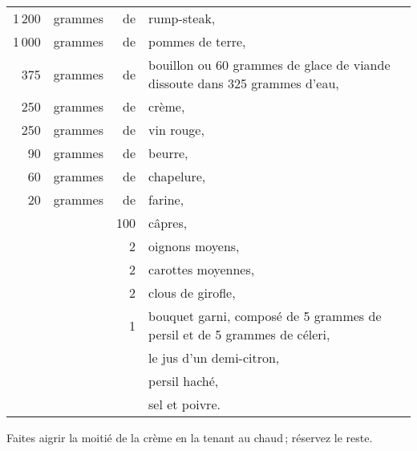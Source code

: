 \footnotesize
\begin{longtable}{rrrp{16em}}
  1 200 & grammes & de  & rump-steak,                                                                     \\
  1 000 & grammes & de  & pommes de terre,                                                                \\
    375 & grammes & de  & bouillon ou 60 grammes de glace de viande dissoute dans 325 grammes d'eau,      \\
    250 & grammes & de  & crème,                                                                          \\
    250 & grammes & de  & vin rouge,                                                                      \\
     90 & grammes & de  & beurre,                                                                         \\
     60 & grammes &  de & chapelure,                                                                      \\
     20 & grammes &  de & farine,                                                                         \\
        &         & 100 & câpres,                                                                         \\
        &         &   2 & oignons moyens,                                                                 \\
        &         &   2 & carottes moyennes,                                                              \\
        &         &   2 & clous de girofle,                                                               \\
        &         &   1 & bouquet garni, composé de 5 grammes de persil et de 5 grammes de céleri,        \\
        &         &     & le jus d'un demi-citron,                                                        \\
        &         &     & persil haché,                                                                   \\
        &         &     & sel et poivre.                                                                  \\
\end{longtable}
\normalsize

Faites aigrir la moitié de la crème en la tenant au chaud ; réservez le reste.

